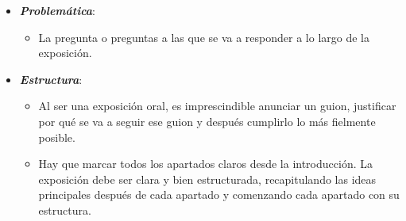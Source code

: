 \documentclass[11pt]{article}
\begin{document}
\begin{itemize}
\begin{itemize}
  \end{itemize}
\item \textbf{\emph{Problemática}}:
  \begin{itemize}
  \item La pregunta o preguntas a las que se va a responder a lo largo de la exposición.
  \end{itemize}
\item \textbf{\emph{Estructura}}:
  \begin{itemize}
  \item Al ser una exposición oral, es imprescindible anunciar un guion, justificar por qué se va a seguir ese guion y después cumplirlo lo más fielmente posible.
  \item Hay que marcar todos los apartados claros desde la introducción. La exposición debe ser clara y bien estructurada, recapitulando las ideas principales después de cada apartado y comenzando cada apartado con su estructura.
  \end{itemize}
\end{itemize}
\end{document}
